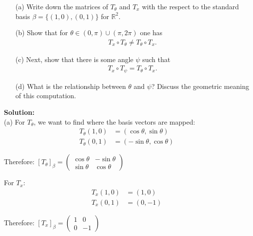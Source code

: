 \documentclass{article}
\begin{document}
\begin{itemize}
    \item[(a)] Write down the matrices of $T_{\theta}$ and $T_x$ with the respect to the standard basis $\beta = \{(1,0),(0,1)\}$ for $\mathbb{R}^2$.

    \item[(b)] Show that for $\theta \in (0,\pi) \cup (\pi,2\pi)$ one has
    \begin{align*}
    T_x \circ T_{\theta} \neq T_{\theta} \circ T_x.
    \end{align*}

    \item[(c)] Next, show that there is some angle $\psi$ such that
    \begin{align*}
    T_x \circ T_{\psi} = T_{\theta} \circ T_x.
    \end{align*}

    \item[(d)] What is the relationship between $\theta$ and $\psi$? Discuss the geometric meaning of this computation.
\end{itemize}

\textbf{Solution: }\\

(a) For $T_{\theta}$, we want to find where the basis vectors are mapped:
\begin{align*}
T_{\theta}(1,0) &= (\cos\theta, \sin\theta)\\
T_{\theta}(0,1) &= (-\sin\theta, \cos\theta)
\end{align*}

Therefore:
$[T_{\theta}]_{\beta} = 
\begin{pmatrix} 
\cos\theta & -\sin\theta \\ 
\sin\theta & \cos\theta 
\end{pmatrix}$

For $T_x$:
\begin{align*}
T_x(1,0) &= (1,0)\\
T_x(0,1) &= (0,-1)
\end{align*}

Therefore:
$[T_x]_{\beta} = 
\begin{pmatrix} 
1 & 0 \\ 
0 & -1 
\end{pmatrix}$ \\
\end{document}
